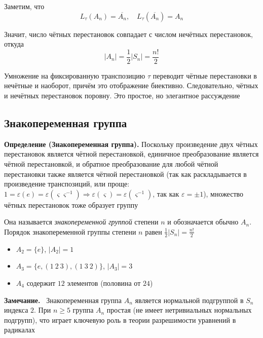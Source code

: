 \documentclass[a4paper,12pt]{article}
\newcommand{\myremark}{\textbf{Замечание.}\ }
\theoremstyle{definition}
\theoremstyle{plain}
\theoremstyle{remark}
\begin{document}
	Заметим, что
	\[
	L_\tau(A_n) = \overline{A_n}, \quad L_\tau(\overline{A_n}) = A_n
	\]
	
	Значит, число чётных перестановок совпадает с числом нечётных перестановок, откуда
	\[
	|A_n| = \frac{1}{2} |S_n| = \frac{n!}{2}
	\]
	
	\begin{tcolorbox}[colback=green!5, colframe=green!50!black, title=Пояснение]
		Умножение на фиксированную транспозицию $\tau$ переводит чётные перестановки в нечётные и наоборот, причём это отображение биективно. Следовательно, чётных и нечётных перестановок поровну. Это простое, но элегантное рассуждение
	\end{tcolorbox}
	
	\subsection{Знакопеременная группа}
	
	\noindent \textbf{Определение (Знакопеременная группа).}
	Поскольку произведение двух чётных перестановок является чётной перестановкой, единичное преобразование является чётной перестановкой, и обратное преобразование для любой чётной перестановки также является чётной перестановкой (так как раскладывается в произведение транспозиций, или проще: $1 = \varepsilon(e) = \varepsilon(\varsigma \varsigma^{-1}) \Rightarrow \varepsilon(\varsigma) = \varepsilon(\varsigma^{-1})$, так как $\varepsilon = \pm 1$), множество чётных перестановок тоже образует группу
	
	Она называется \textit{знакопеременной группой} степени $n$ и обозначается обычно $A_n$. Порядок знакопеременной группы степени $n$ равен $\frac{1}{2} |S_n| = \frac{n!}{2}$
	
	\begin{tcolorbox}[colback=gray!5, colframe=gray!50, title=Примеры]
		\begin{itemize}
			\item $A_2 = \{e\}$, $|A_2| = 1$
			\item $A_3 = \{e, (1\ 2\ 3), (1\ 3\ 2)\}$, $|A_3| = 3$
			\item $A_4$ содержит $12$ элементов (половина от $24$)
		\end{itemize}
	\end{tcolorbox}
	
	\myremark
	Знакопеременная группа $A_n$ является нормальной подгруппой в $S_n$ индекса $2$. При $n \geq 5$ группа $A_n$ простая (не имеет нетривиальных нормальных подгрупп), что играет ключевую роль в теории разрешимости уравнений в радикалах
	
\end{document}
